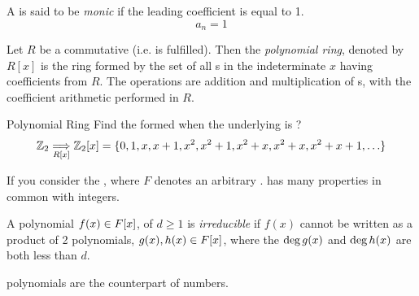 \begin{definition}[Monic]\label{def:Monic_Polynomial}
  A  is said to be \emph{monic} if the leading coefficient is equal to 1.
  \begin{equation}\label{eq:Monic_Polynomial}
    a_{n} = 1
  \end{equation}
\end{definition}

\begin{definition}\label{def:Polynomial_Ring}
  Let $R$ be a commutative  (i.e.  is fulfilled).
  Then the \emph{polynomial ring}, denoted by $R[x]$ is the ring formed by the set of all s in the indeterminate $x$ having coefficients from $R$.
  The operations are addition and multiplication of s, with the coefficient arithmetic performed in $R$.
\end{definition}

\begin{example}[Lecture 2]{Polynomial Ring}
  Find the  formed when the underlying  is ?
  \tcblower{}
  \begin{equation*}
    \operatorname{\mathbb{Z}}_{2} \underset{R[x]}{\Longrightarrow} \operatorname{\mathbb{Z}}_{2}[x] = \lbrace 0, 1, x, x+1, x^{2}, x^{2}+1, x^{2}+x, x^{2}+x, x^{2}+x+1, \ldots \rbrace
  \end{equation*}
\end{example}

If you consider the , where $F$ denotes an arbitrary .
 has many properties in common with integers.

\begin{definition}[Irreducible]\label{def:Irreducible_Polynomial}
  A polynomial $f(x) \in F[x]$, of  $d \geq 1$ is \emph{irreducible} if $f(x)$ cannot be written as a product of 2 polynomials, $g(x), h(x) \in F[x]$, where the $\operatorname{\text{deg}} g(x)$ and $\operatorname{\text{deg}} h(x)$ are both less than $d$.

  \begin{remark}\label{rmk:Irreducible_Polynomials_and_Prime_Numbers}
     polynomials are the  counterpart of  numbers.
  \end{remark}
\end{definition}

